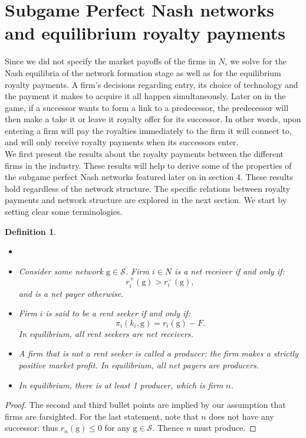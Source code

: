\documentclass{article}
\newtheorem{definition}{Definition}
\begin{document}
\section{Subgame Perfect Nash networks and equilibrium royalty payments}
Since we did not specify the market payoffs of the firms in $N$, we solve for the Nash equilibria of the network formation stage as well as for the equilibrium royalty payments. A firm's decisions regarding entry, its choice of technology and the payment it makes to acquire it all happen simultaneously. Later on in the game, if a successor wants to form a link to a predecessor, the predecessor will then make a take it or leave it royalty offer for its successor. In other words, upon entering a firm will pay the royalties immediately to the firm it will connect to, and will only receive royalty payments when its successors enter.  \\ 
\indent We first present the results about the royalty payments between the different firms in the industry. These results will help to derive some of the properties of the subgame perfect Nash networks featured later on in section 4. These results hold regardless of the network structure. The specific relations between royalty payments and network structure are explored in the next section. We start by setting clear some terminologies. 
\begin{definition}\label{netrandp}
\begin{itemize}
\item[]
    \item Consider some network $\text{g}\in \mathcal{S}$. Firm $i\in N$ is a net receiver if and only if: 
    \begin{equation*}
        r_i^+(\text{g})> r_i^-(\text{g}),
    \end{equation*}
    and is a net payer otherwise. 
    \item Firm $i$ is said to be a rent seeker if and only if:
    \begin{equation*}
        \pi_i(k_i,\text{g})=r_i(\text{g})-F.
    \end{equation*}
    In equilibrium, all rent seekers are net receivers. 
    \item A firm that is not a rent seeker is called a producer: the firm makes a strictly positive market profit. In equilibrium, all net payers are producers.
    \item In equilibrium, there is at least 1 producer, which is firm $n$. 
\end{itemize}
\end{definition}
\begin{proof}
The second and third bullet points are implied by our assumption that firms are farsighted. For the last statement, note that $n$ does not have any successor: thus $r_n(\text{g})\leq 0$ for any $\text{g}\in \mathcal{S}$. Thence $n$ must produce. 
\end{proof}
\end{document}
